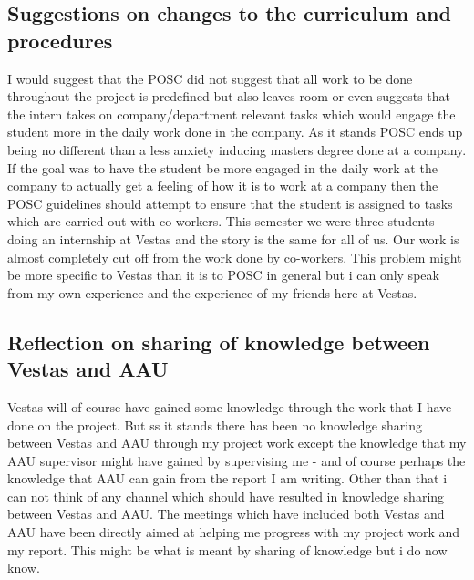 \subsection{Suggestions on changes to the curriculum and procedures}

I would suggest that the POSC did not suggest that all work to be done throughout the project is predefined but also leaves room or even suggests that the intern takes on company/department relevant tasks which would engage the student more in the daily work done in the company. As it stands POSC ends up being no different than a less anxiety inducing masters degree done at a company. If the goal was to have the student be more engaged in the daily work at the company to actually get a feeling of how it is to work at a company then the POSC guidelines should attempt to ensure that the student is assigned to tasks which are carried out with co-workers. This semester we were three students doing an internship at Vestas and the story is the same for all of us. Our work is almost completely cut off from the work done by co-workers. This problem might be more specific to Vestas than it is to POSC in general but i can only speak from my own experience and the experience of my friends here at Vestas.


\subsection{Reflection on sharing of knowledge between Vestas and AAU}
Vestas will of course have gained some knowledge through the work that I have done on the project. But ss it stands there has been no knowledge sharing between Vestas and AAU through my project work except the knowledge that my AAU supervisor might have gained by supervising me - and of course perhaps the knowledge that AAU can gain from the report I am writing. Other than that i can not think of any channel which should have resulted in knowledge sharing between Vestas and AAU. The meetings which have included both Vestas and AAU have been directly aimed at helping me progress with my project work and my report. This might be what is meant by sharing of knowledge but i do now know.
